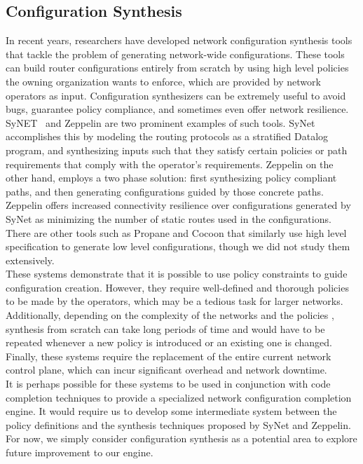\subsection{Configuration Synthesis} 

In recent years, researchers have developed network configuration synthesis tools that tackle the problem of generating network-wide configurations. These tools can build router configurations entirely from scratch by using high level policies the owning organization wants to enforce, which are provided by network operators as input. Configuration synthesizers can be extremely useful to avoid bugs, guarantee policy compliance, and sometimes even offer network resilience.\\ 

SyNET~\cite{synet} and Zeppelin are two prominent examples of such tools. SyNet accomplishes this by modeling the routing protocols as a stratified Datalog program, and synthesizing inputs such that they satisfy certain policies or path requirements that comply with the operator’s requirements. Zeppelin on the other hand, employs a two phase solution: first synthesizing policy compliant paths, and then generating configurations guided by those concrete paths. Zeppelin offers increased connectivity resilience over configurations generated by SyNet as minimizing the number of static routes used in the configurations. There are other tools such as Propane and Cocoon that similarly use high level specification to generate low level configurations, though we did not study them extensively.\\
 
These systems demonstrate that it is possible to use policy constraints to guide configuration creation.  However, they require well-defined and thorough policies to be made by the operators, which may be a tedious task for larger networks. Additionally, depending on the complexity of the networks and the policies , synthesis from scratch can take long periods of time and would have to be repeated whenever a new policy is introduced or an existing one is changed. Finally, these systems require the replacement of the entire current network control plane, which can incur significant overhead and network downtime.\\

It is perhaps possible for these systems to be used in conjunction with code completion techniques to provide a specialized network configuration completion engine. It would require us to develop some intermediate system between the policy definitions and the synthesis techniques proposed by SyNet and Zeppelin. For now, we simply consider configuration synthesis as a potential area to explore future improvement to our engine. 

